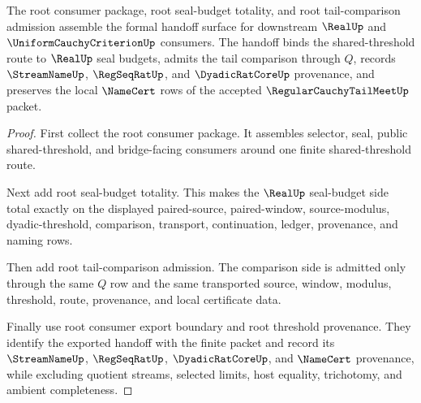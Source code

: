\begin{theorem}
\label{thm:regular-cauchy-tail-meet-root-formal-handoff-surface}
The root consumer package, root seal-budget totality, and root tail-comparison admission assemble the formal handoff surface for downstream $\RealUp$ and $\UniformCauchyCriterionUp$ consumers. The handoff binds the shared-threshold route to $\RealUp$ seal budgets, admits the tail comparison through $Q$, records $\StreamNameUp$, $\RegSeqRatUp$, and $\DyadicRatCoreUp$ provenance, and preserves the local $\NameCert$ rows of the accepted $\RegularCauchyTailMeetUp$ packet.
\end{theorem}
\begin{proof}
First collect the root consumer package. It assembles selector, seal, public shared-threshold, and bridge-facing consumers around one finite shared-threshold route.

Next add root seal-budget totality. This makes the $\RealUp$ seal-budget side total exactly on the displayed paired-source, paired-window, source-modulus, dyadic-threshold, comparison, transport, continuation, ledger, provenance, and naming rows.

Then add root tail-comparison admission. The comparison side is admitted only through the same $Q$ row and the same transported source, window, modulus, threshold, route, provenance, and local certificate data.

Finally use root consumer export boundary and root threshold provenance. They identify the exported handoff with the finite packet and record its $\StreamNameUp$, $\RegSeqRatUp$, $\DyadicRatCoreUp$, and $\NameCert$ provenance, while excluding quotient streams, selected limits, host equality, trichotomy, and ambient completeness.
\end{proof}

